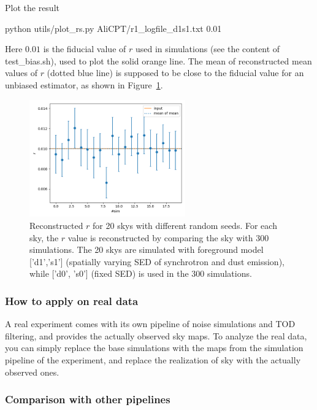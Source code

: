 \documentclass[12pt, a4paper]{ctexart} %
\def\tbox#1{\begin{tcolorbox}#1\end{tcolorbox}}
\begin{document}
Plot the result
\tbox{python utils/plot\_rs.py AliCPT/r1\_logfile\_d1s1.txt 0.01}

Here $0.01$ is the fiducial value of $r$ used in simulations (see the content of test\_bias.sh), used to plot the solid orange line. The mean of reconstructed mean values of $r$ (dotted blue line) is supposed to be close to the fiducial value for an unbiased estimator, as shown in Figure~\ref{fig:r_logs}.

\begin{figure}
  \centering
  \includegraphics[width=0.6\textwidth]{r_logs.png}
  \caption{Reconstructed $r$ for 20 skys with different random seeds. For each sky, the $r$ value is reconstructed by comparing the sky with 300 simulations. The 20 skys are simulated with foreground model ['d1','s1'] (spatially varying SED of synchrotron and dust emission), while  ['d0', 's0'] (fixed SED) is used in the 300 simulations. \label{fig:r_logs}}
\end{figure}


\subsubsection{How to apply on real data}

A real experiment comes with its own pipeline of noise simulations and TOD filtering, and provides the actually observed sky maps. To analyze the real data, you can simply replace the base simulations with the maps from the simulation pipeline of the experiment, and replace the realization of sky with the actually observed ones.


\subsubsection{Comparison with other pipelines}
\end{document}
